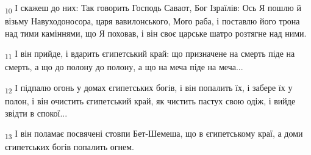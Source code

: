 \begin{tcolorbox}
\textsubscript{10} І скажеш до них: Так говорить Господь Саваот, Бог Ізраїлів: Ось Я пошлю й візьму Навуходоносора, царя вавилонського, Мого раба, і поставлю його трона над тими каміннями, що Я поховав, і він своє царське шатро розтягне над ними.
\end{tcolorbox}
\begin{tcolorbox}
\textsubscript{11} І він прийде, і вдарить єгипетський край: що призначене на смерть піде на смерть, а що до полону до полону, а що на меча піде на меча...
\end{tcolorbox}
\begin{tcolorbox}
\textsubscript{12} І підпалю огонь у домах єгипетських богів, і він попалить їх, і забере їх у полон, і він очистить єгипетський край, як чистить пастух свою одіж, і вийде звідти в спокої...
\end{tcolorbox}
\begin{tcolorbox}
\textsubscript{13} І він поламає посвячені стовпи Бет-Шемеша, що в єгипетському краї, а доми єгипетських богів попалить огнем.
\end{tcolorbox}
